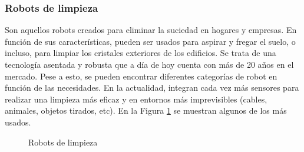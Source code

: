 \subsubsection{Robots de limpieza}
Son aquellos robots creados para eliminar la suciedad en hogares y empresas. En función de sus características, pueden ser usados para aspirar y fregar el suelo, o incluso,
para limpiar los cristales exteriores de los edificios. Se trata de una tecnología asentada y robusta que a día de hoy cuenta con más de 20 años en el mercado. Pese a esto, 
se pueden encontrar diferentes categorías de robot en función de las necesidades. En la actualidad, integran cada vez más sensores para realizar una limpieza más eficaz y 
en entornos más imprevisibles (cables, animales, objetos tirados, etc). En la Figura \ref{fig:limpieza} se muestran algunos de los más usados.

\begin{figure} [ht!]
  \centering    
  \hspace{1cm}
  \hspace{1cm}
  \caption{Robots de limpieza}
  \label{fig:limpieza}
\end{figure}

